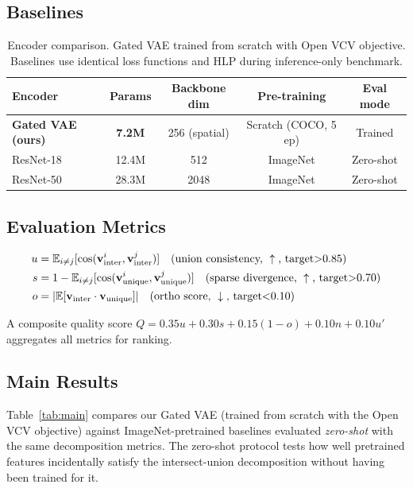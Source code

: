 \documentclass[10pt,twocolumn]{article}
\begin{document}
\subsection{Baselines}

\begin{table}[h]
\centering\small
\caption{Encoder comparison. Gated VAE trained from scratch with Open VCV objective.
Baselines use identical loss functions and HLP during inference-only benchmark.}
\label{tab:baselines}
\begin{tabular}{lcccc}
\toprule
Encoder & Params & Backbone dim & Pre-training & Eval mode \\
\midrule
\textbf{Gated VAE (ours)} & \textbf{7.2M}  & 256 (spatial) & Scratch (COCO, 5 ep) & Trained \\
ResNet-18                  & 12.4M          & 512           & ImageNet              & Zero-shot \\
ResNet-50                  & 28.3M          & 2048          & ImageNet              & Zero-shot \\
\bottomrule
\end{tabular}
\end{table}

\subsection{Evaluation Metrics}

\begin{align*}
u &= \mathbb{E}_{i\neq j}[\cos(\mathbf{v}^i_{\rm inter}, \mathbf{v}^j_{\rm inter})]
     \quad\text{(union consistency, }\uparrow\text{, target}{>}0.85\text{)}\\
s &= 1-\mathbb{E}_{i\neq j}[\cos(\mathbf{v}^i_{\rm unique}, \mathbf{v}^j_{\rm unique})]
     \quad\text{(sparse divergence, }\uparrow\text{, target}{>}0.70\text{)}\\
o &= |\mathbb{E}[\mathbf{v}_{\rm inter}\cdot\mathbf{v}_{\rm unique}]|
     \quad\text{(ortho score, }\downarrow\text{, target}{<}0.10\text{)}
\end{align*}

A composite quality score $Q = 0.35u + 0.30s + 0.15(1{-}o) + 0.10n + 0.10u'$
aggregates all metrics for ranking.

\subsection{Main Results}
\label{sec:results}

Table~\ref{tab:main} compares our Gated VAE (trained from scratch with the
Open VCV objective) against ImageNet-pretrained baselines evaluated \emph{zero-shot}
with the same decomposition metrics. The zero-shot protocol tests how well
pretrained features incidentally satisfy the intersect-union decomposition without
having been trained for it.
\end{document}
